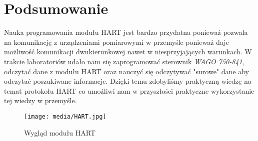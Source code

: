 \documentclass{article}
\begin{document}
\section{Podsumowanie}
Nauka programowania modułu HART jest bardzo przydatna ponieważ pozwala na komunikację z urządzeniami pomiarowymi w przemyśle ponieważ daje możliwość komunikacji dwukierunkowej nawet w niesprzyjających warunkach. W trakcie laboratoriów udało nam się zaprogramować sterownik \textit{WAGO 750-841}, odczytać dane z modułu HART oraz nauczyć się odczytywać "surowe" dane aby odczytać poszukiwane informacje. Dzięki temu zdobyliśmy praktyczną wiedzę na temat protokołu HART co umożliwi nam w przyszłości praktyczne wykorzystanie tej wiedzy w przemyśle.
\vspace{1em}
\begin{figure}[H]
    \centering
    \texttt{[image: media/HART.jpg]}
    \caption{Wygląd modułu HART}
\end{figure}
\end{document}
